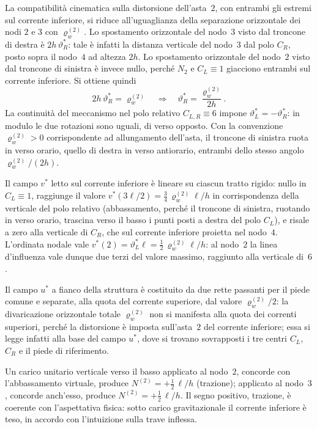 \begin{esempio}
\begin{svolgimento}
		La compatibilità cinematica sulla distorsione dell'asta~$2$, con
		entrambi gli estremi sul corrente inferiore, si riduce
		all'uguaglianza della separazione orizzontale dei nodi $2$ e $3$
		con $\varrho_w^{(2)}$.
		Lo spostamento orizzontale del nodo~$3$ visto dal troncone di
		destra è $2h\,\vartheta_R^*$: tale è infatti la distanza verticale
		del nodo~$3$ dal polo $C_R$, posto sopra il nodo~$4$ ad altezza
		$2h$. Lo spostamento orizzontale del nodo~$2$ visto dal troncone
		di sinistra è invece nullo, perché $N_2$ e $C_L\equiv 1$ giacciono
		entrambi sul corrente inferiore. Si ottiene quindi
		\begin{equation*}
			2h\,\vartheta_R^* = \varrho_w^{(2)}
			\quad\Longrightarrow\quad
			\vartheta_R^* = \frac{\varrho_w^{(2)}}{2h}.
		\end{equation*}
		La continuità del meccanismo nel polo relativo $C_{L,R}\equiv 6$
		impone $\vartheta_L^* = -\vartheta_R^*$: in modulo le due
		rotazioni sono uguali, di verso opposto. Con la convenzione
		$\varrho_w^{(2)}>0$ corrispondente ad allungamento dell'asta, il
		troncone di sinistra ruota in verso orario, quello di destra in
		verso antiorario, entrambi dello stesso angolo
		$\varrho_w^{(2)}/(2h)$.
		
		Il campo $v^*$ letto sul corrente inferiore è lineare su ciascun
		tratto rigido: nullo in $C_L\equiv 1$, raggiunge il valore
		$v^*(3\ell/2)=\tfrac{3}{4}\,\varrho_w^{(2)}\ell/h$ in corrispondenza
		della verticale del polo relativo (abbassamento, perché il troncone
		di sinistra, ruotando in verso orario, trascina verso il basso i
		punti posti a destra del polo $C_L$), e risale a zero alla
		verticale di $C_R$, che sul corrente inferiore proietta nel
		nodo~$4$. L'ordinata nodale vale
		$v^*(2)=\vartheta_L^*\ell=\tfrac{1}{2}\,\varrho_w^{(2)}\ell/h$: al
		nodo~$2$ la linea d'influenza vale dunque due terzi del valore
		massimo, raggiunto alla verticale di~$6$.
		
		Il campo $u^*$ a fianco della struttura è costituito da due rette
		passanti per il piede comune e separate, alla quota del corrente
		superiore, dal valore $\varrho_w^{(2)}/2$: la divaricazione
		orizzontale totale $\varrho_w^{(2)}$ non si manifesta alla quota
		dei correnti superiori, perché la distorsione è imposta sull'asta~$2$
		del corrente inferiore; essa si legge infatti alla base del campo
		$u^*$, dove si trovano sovrapposti i tre centri $C_L$, $C_R$ e il
		piede di riferimento.
		
		Un carico unitario verticale verso il basso applicato al nodo~$2$,
		concorde con l'abbassamento virtuale, produce
		$N^{(2)}=+\tfrac{1}{2}\,\ell/h$ (trazione); applicato al nodo~$3$,
		concorde anch'esso, produce $N^{(2)}=+\tfrac{1}{2}\,\ell/h$. Il
		segno positivo, trazione, è coerente con l'aspettativa fisica:
		sotto carico gravitazionale il corrente inferiore è teso, in
		accordo con l'intuizione sulla trave inflessa.
		

\end{svolgimento}
\end{esempio}

